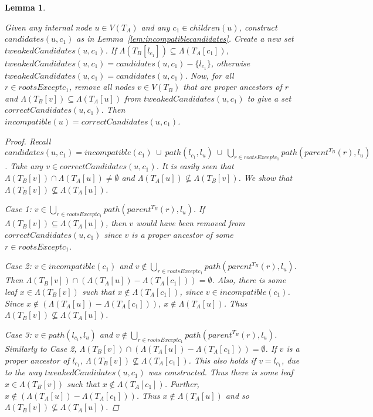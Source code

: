 \documentclass{article}
\newcommand{\leafset}{\Lambda}
\newtheorem{incompatibleactualset}[incompatibility]{Lemma}
\begin{document}
    \begin{incompatibleactualset}
        \label{lem:incompatibleactualset}

        Given any internal node $u \in V(T_A)$ and any $c_1 \in children(u)$, construct $candidates(u, c_1)$ as in Lemma~\ref{lem:incompatiblecandidates}. Create a new set $tweakedCandidates(u, c_1)$. If $\leafset(T_B[l_{c_1}]) \subseteq \leafset(T_A[c_1])$, $tweakedCandidates(u, c_1) = candidates(u, c_1) - \{l_{c_1}\}$, otherwise $tweakedCandidates(u, c_1) = candidates(u, c_1)$. Now, for all $r \in rootsExceptc_1$, remove all nodes $v \in V(T_B)$ that are proper ancestors of $r$ and $\leafset(T_B[v]) \subseteq \leafset(T_A[u])$ from $tweakedCandidates(u, c_1)$ to give a set $correctCandidates(u, c_1)$. Then $incompatible(u) = correctCandidates(u, c_1)$.

        \begin{proof}
            Recall $candidates(u, c_1) = incompatible(c_1)\ \cup\ path(l_{c_1}, l_u)\ \cup\ \bigcup_{r \in rootsExceptc_1} path(parent^{T_B}(r), l_u)$. Take any $v \in correctCandidates(u, c_1)$. It is easily seen that $\leafset(T_B[v]) \cap \leafset(T_A[u]) \neq \emptyset$ and $\leafset(T_A[u]) \not\subseteq \leafset(T_B[v])$. We show that $\leafset(T_B[v]) \not\subseteq \leafset(T_A[u])$.

            \textit{Case 1}: $v \in \bigcup_{r \in rootsExceptc_1} path(parent^{T_B}(r), l_u)$. If $\leafset(T_B[v]) \subseteq \leafset(T_A[u])$, then $v$ would have been removed from $correctCandidates(u, c_1)$ since $v$ is a proper ancestor of some $r \in rootsExceptc_1$.

            \textit{Case 2}: $v \in incompatible(c_1)$ and $v \not\in \bigcup_{r \in rootsExceptc_1} path(parent^{T_B}(r), l_u)$. Then $\leafset(T_B[v]) \cap (\leafset(T_A[u]) - \leafset(T_A[c_1])) = \emptyset$. Also, there is some leaf $x \in \leafset(T_B[v])$ such that $x \not\in \leafset(T_A[c_1])$, since $v \in incompatible(c_1)$. Since $x \not\in (\leafset(T_A[u]) - \leafset(T_A[c_1]))$, $x \not\in \leafset(T_A[u])$. Thus $\leafset(T_B[v]) \not\subseteq \leafset(T_A[u])$.

            \textit{Case 3}: $v \in path(l_{c_1}, l_u)$ and $v \not\in \bigcup_{r \in rootsExceptc_1} path(parent^{T_B}(r), l_u)$. Similarly to \textit{Case 2}, $\leafset(T_B[v]) \cap (\leafset(T_A[u]) - \leafset(T_A[c_1])) = \emptyset$. If $v$ is a proper ancestor of $l_{c_1}$, $\leafset(T_B[v]) \not\subseteq \leafset(T_A[c_1])$. This also holds if $v = l_{c_1}$, due to the way $tweakedCandidates(u, c_1)$ was constructed. Thus there is some leaf $x \in \leafset(T_B[v])$ such that $x \not\in \leafset(T_A[c_1])$. Further, $x \not\in (\leafset(T_A[u]) - \leafset(T_A[c_1]))$. Thus $x \not\in \leafset(T_A[u])$ and so $\leafset(T_B[v]) \not\subseteq \leafset(T_A[u])$.


\end{proof}
\end{incompatibleactualset}
\end{document}
